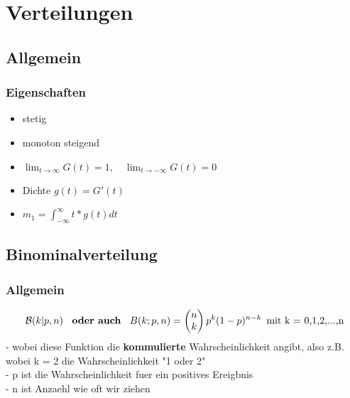 \documentclass{article}
\begin{document}
\section{Verteilungen}
\subsection{Allgemein}
\subsubsection{Eigenschaften}
\begin{itemize}		
	\item stetig
	\item monoton steigend
	\item $\lim_{t \to \infty} G(t) = 1, \quad \lim_{t \to -\infty} G(t) = 0$
	\item Dichte $g(t) = G'(t)$
	\item $m_1 = \int_{-\infty}^{\infty}t*g(t)dt$
\end{itemize}
\subsection{Binominalverteilung}
\subsubsection{Allgemein}
\[
	\mathcal{B}(k | p,n) \enspace \textbf{ oder auch } \enspace B(k;p,n) = 
\begin{pmatrix} n \\ k \end{pmatrix} p^k(1-p)^{n-k} \enspace \newline
\text{mit k = 0,1,2,...,n} \]
- wobei diese Funktion die \textbf{kommulierte} Wahrscheinlichkeit angibt, also z.B.
wobei k = 2 die Wahrscheinlichkeit "1 oder 2"
\\ - p ist die Wahrscheinlichkeit fuer ein positives Ereigbnis
\\ - n ist Anzaehl wie oft wir ziehen
\end{document}
